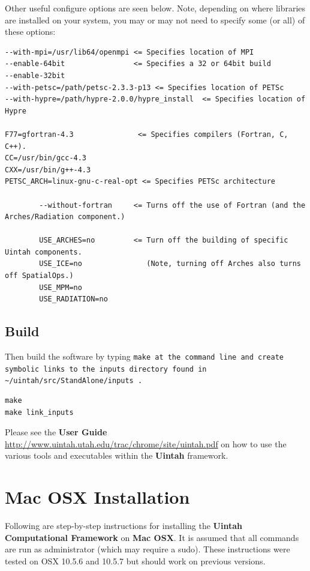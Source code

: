 \documentclass[12pt]{article}
\newcommand{\TT}[1]{\tt{#1} \normalfont}
\begin{document}
Other useful configure options are seen below.  Note, depending on
where libraries are installed on your system, you may or may not need
to specify some (or all) of these options:

\begin{verbatim}
--with-mpi=/usr/lib64/openmpi <= Specifies location of MPI
--enable-64bit                <= Specifies a 32 or 64bit build
--enable-32bit
--with-petsc=/path/petsc-2.3.3-p13 <= Specifies location of PETSc
--with-hypre=/path/hypre-2.0.0/hypre_install  <= Specifies location of Hypre

F77=gfortran-4.3               <= Specifies compilers (Fortran, C, C++).
CC=/usr/bin/gcc-4.3
CXX=/usr/bin/g++-4.3
PETSC_ARCH=linux-gnu-c-real-opt <= Specifies PETSc architecture

        --without-fortran     <= Turns off the use of Fortran (and the Arches/Radiation component.)

        USE_ARCHES=no         <= Turn off the building of specific Uintah components.
        USE_ICE=no               (Note, turning off Arches also turns off SpatialOps.)
        USE_MPM=no
        USE_RADIATION=no

\end{verbatim}


\subsection{Build}

Then build the software by typing \TT{make} at the command line and create symbolic links to the inputs directory found in \TT{\textasciitilde/uintah/src/StandAlone/inputs}.
\begin{verbatim}
make
make link_inputs
\end{verbatim}

Please see the \textbf{User Guide}
\url{http://www.uintah.utah.edu/trac/chrome/site/uintah.pdf} on how to use
the various tools and executables within the \textbf{Uintah}
framework.

\section{Mac OSX Installation}

Following are step-by-step instructions for installing the
\textbf{Uintah Computational Framework} on \textbf{Mac OSX}.  It is
assumed that all commands are run as administrator (which may require
a sudo).  These instructions were tested on OSX 10.5.6 and 10.5.7 but
should work on previous versions.
\end{document}
